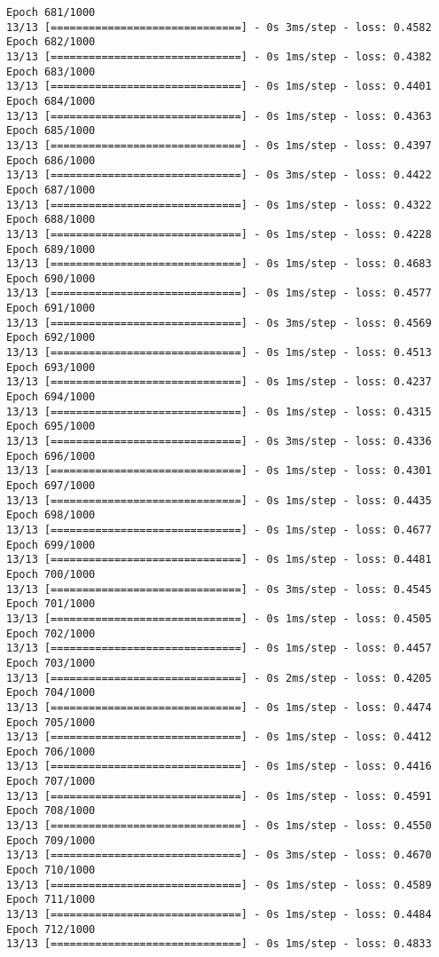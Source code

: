 \documentclass[11pt]{article}
\begin{document}
\begin{Verbatim}[commandchars=\\\{\}]
Epoch 681/1000
13/13 [==============================] - 0s 3ms/step - loss: 0.4582
Epoch 682/1000
13/13 [==============================] - 0s 1ms/step - loss: 0.4382
Epoch 683/1000
13/13 [==============================] - 0s 1ms/step - loss: 0.4401
Epoch 684/1000
13/13 [==============================] - 0s 1ms/step - loss: 0.4363
Epoch 685/1000
13/13 [==============================] - 0s 1ms/step - loss: 0.4397
Epoch 686/1000
13/13 [==============================] - 0s 3ms/step - loss: 0.4422
Epoch 687/1000
13/13 [==============================] - 0s 1ms/step - loss: 0.4322
Epoch 688/1000
13/13 [==============================] - 0s 1ms/step - loss: 0.4228
Epoch 689/1000
13/13 [==============================] - 0s 1ms/step - loss: 0.4683
Epoch 690/1000
13/13 [==============================] - 0s 1ms/step - loss: 0.4577
Epoch 691/1000
13/13 [==============================] - 0s 3ms/step - loss: 0.4569
Epoch 692/1000
13/13 [==============================] - 0s 1ms/step - loss: 0.4513
Epoch 693/1000
13/13 [==============================] - 0s 1ms/step - loss: 0.4237
Epoch 694/1000
13/13 [==============================] - 0s 1ms/step - loss: 0.4315
Epoch 695/1000
13/13 [==============================] - 0s 3ms/step - loss: 0.4336
Epoch 696/1000
13/13 [==============================] - 0s 1ms/step - loss: 0.4301
Epoch 697/1000
13/13 [==============================] - 0s 1ms/step - loss: 0.4435
Epoch 698/1000
13/13 [==============================] - 0s 1ms/step - loss: 0.4677
Epoch 699/1000
13/13 [==============================] - 0s 1ms/step - loss: 0.4481
Epoch 700/1000
13/13 [==============================] - 0s 3ms/step - loss: 0.4545
Epoch 701/1000
13/13 [==============================] - 0s 1ms/step - loss: 0.4505
Epoch 702/1000
13/13 [==============================] - 0s 1ms/step - loss: 0.4457
Epoch 703/1000
13/13 [==============================] - 0s 2ms/step - loss: 0.4205
Epoch 704/1000
13/13 [==============================] - 0s 1ms/step - loss: 0.4474
Epoch 705/1000
13/13 [==============================] - 0s 1ms/step - loss: 0.4412
Epoch 706/1000
13/13 [==============================] - 0s 1ms/step - loss: 0.4416
Epoch 707/1000
13/13 [==============================] - 0s 1ms/step - loss: 0.4591
Epoch 708/1000
13/13 [==============================] - 0s 1ms/step - loss: 0.4550
Epoch 709/1000
13/13 [==============================] - 0s 3ms/step - loss: 0.4670
Epoch 710/1000
13/13 [==============================] - 0s 1ms/step - loss: 0.4589
Epoch 711/1000
13/13 [==============================] - 0s 1ms/step - loss: 0.4484
Epoch 712/1000
13/13 [==============================] - 0s 1ms/step - loss: 0.4833

\end{Verbatim}
\end{document}
